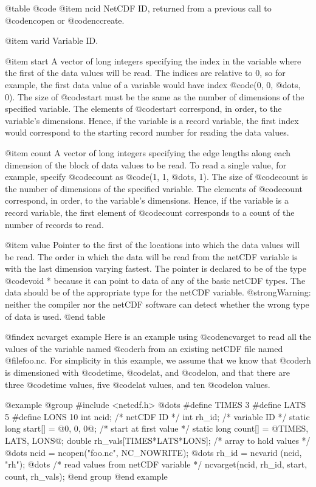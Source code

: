 @table @code
@item ncid
NetCDF ID, returned from a previous call to @code{ncopen} or
@code{nccreate}.

@item varid
Variable ID.

@item start
A vector of long integers specifying the index in the
variable where the first of the data values will be read.
The indices are relative to 0, so for example, the first data
value of a variable would have index @code{(0, 0, @dots{}, 0)}.  The
size of @code{start} must be the same as the number of dimensions of the
specified variable.  The elements of @code{start} correspond, in order, to the
variable's dimensions.  Hence, if the variable is a record
variable, the first index would correspond to the starting record number
for reading the data values.

@item count
A vector of long integers specifying the edge lengths along each dimension
of the block of data values to be read.
To read a single value, for example, specify @code{count} as
@code{(1, 1, @dots{}, 1)}.  The size of @code{count} is the number of
dimensions of the specified variable.  The elements of @code{count}
correspond, in order, to the variable's dimensions.  Hence, if the variable is a
record variable, the first element of @code{count} corresponds to a
count of the number of records to read.

@item value
Pointer to the first of the locations into which the data values will be
read.  The order in which the data will be read from the netCDF variable
is with the last dimension varying fastest.
The pointer is declared to be of the type @code{void *} because it can
point to data of any of the basic netCDF types.  The data should be of
the appropriate type for the netCDF variable.  @strong{Warning: neither
the compiler nor the netCDF software can detect whether the wrong type
of data is used.}
@end table

@findex ncvarget example
Here is an example using @code{ncvarget} to read all the values of the
variable named @code{rh} from an existing netCDF file named
@file{foo.nc}.  For simplicity in this example, we assume that we know
that @code{rh} is dimensioned with @code{time}, @code{lat}, and
@code{lon}, and that there are three @code{time} values, five @code{lat}
values, and ten @code{lon} values.

@example
@group
#include <netcdf.h>
   @dots{}
#define TIMES 3
#define LATS 5
#define LONS 10
int ncid; /* netCDF ID */
int rh_id; /* variable ID */
static long start[] = @{0, 0, 0@}; /* start at first value */
static long count[] = @{TIMES, LATS, LONS@};
double rh_vals[TIMES*LATS*LONS]; /* array to hold values */
   @dots{}
ncid = ncopen("foo.nc", NC_NOWRITE);
   @dots{}
rh_id = ncvarid (ncid, "rh");
   @dots{}
/* read values from netCDF variable */
ncvarget(ncid, rh_id, start, count, rh_vals);
@end group
@end example

